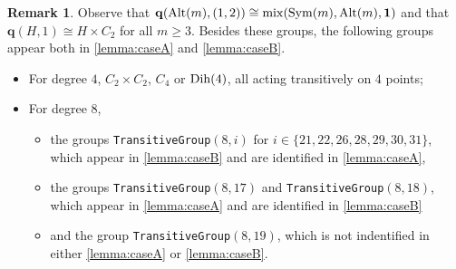 \documentclass[a4paper]{amsart}
\newcommand{\Sym}{\mathrm{Sym}}
\newcommand{\Alt}{\mathrm{Alt}}
\newcommand{\mix}{\mathop{\mathrm{mix}}}
\newcommand{\qrk}{\mathbf{q}}
\newcommand{\Dih}{\rm Dih}
\theoremstyle{definition}
\newtheorem{remark}[theorem]{Remark}
\begin{document}
\begin{remark}
    Observe that $\qrk(\Alt(m), (1,2)) \cong \mix(\Sym(m), \Alt(m), {\bf 1})$ and that  $\qrk(H,1) \cong H \times C_2$ for all $m \ge 3$. Besides these groups, the following groups appear both in \cref{lemma:caseA} and \cref{lemma:caseB}.
    \begin{itemize}
        \item For degree $4$, $C_2\times C_2$, $C_4$ or $\Dih(4)$, all acting transitively on $4$ points;
        \item For degree $8$,
        \begin{itemize}
            \item the groups {\tt TransitiveGroup}$(8,i)$ for $i \in \{21,22,26,28,29,30,31\}$, which appear in \cref{lemma:caseB} and are identified in \cref{lemma:caseA},
        \item the groups {\tt TransitiveGroup}$(8,17)$ and {\tt TransitiveGroup}$(8,18)$, which appear in \cref{lemma:caseA} and are identified in \cref{lemma:caseB}
        \item and the group {\tt TransitiveGroup}$(8,19)$, which is not indentified in either \cref{lemma:caseA} or \cref{lemma:caseB}.
        \end{itemize}
    \end{itemize}
\end{remark}
\end{document}
